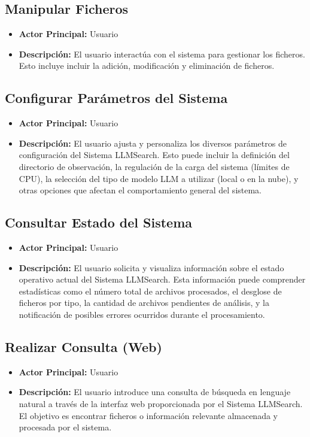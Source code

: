 \subsection{Manipular Ficheros}
\begin{itemize}
\item \textbf{Actor Principal:} Usuario
\item \textbf{Descripción:} El usuario interactúa con el sistema para gestionar los ficheros. Esto incluye incluir la adición, modificación y eliminación de ficheros.
\end{itemize}

\subsection{Configurar Parámetros del Sistema}
\begin{itemize}
\item \textbf{Actor Principal:} Usuario
\item \textbf{Descripción:} El usuario ajusta y personaliza los diversos parámetros de configuración del Sistema LLMSearch. Esto puede incluir la definición del directorio de observación, la regulación de la carga del sistema (límites de CPU), la selección del tipo de modelo LLM a utilizar (local o en la nube), y otras opciones que afectan el comportamiento general del sistema.
\end{itemize}

\subsection{Consultar Estado del Sistema}
\begin{itemize}
\item \textbf{Actor Principal:} Usuario
\item \textbf{Descripción:} El usuario solicita y visualiza información sobre el estado operativo actual del Sistema LLMSearch. Esta información puede comprender estadísticas como el número total de archivos procesados, el desglose de ficheros por tipo, la cantidad de archivos pendientes de análisis, y la notificación de posibles errores ocurridos durante el procesamiento.
\end{itemize}

\subsection{Realizar Consulta (Web)}
\begin{itemize}
\item \textbf{Actor Principal:} Usuario
\item \textbf{Descripción:} El usuario introduce una consulta de búsqueda en lenguaje natural a través de la interfaz web proporcionada por el Sistema LLMSearch. El objetivo es encontrar ficheros o información relevante almacenada y procesada por el sistema.
\end{itemize}

